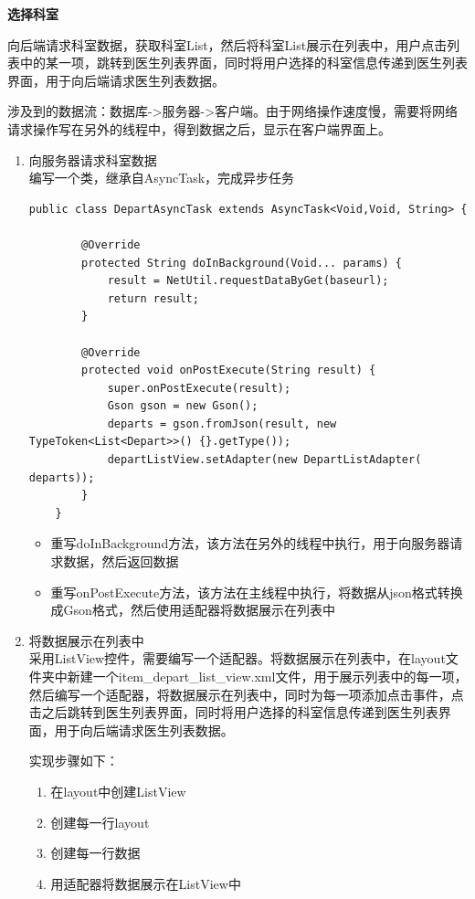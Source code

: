 \documentclass[UTF8,12pt]{article}
\begin{document}
\textbf{选择科室}

向后端请求科室数据，获取科室List，然后将科室List展示在列表中，用户点击列表中的某一项，跳转到医生列表界面，同时将用户选择的科室信息传递到医生列表界面，用于向后端请求医生列表数据。

涉及到的数据流：数据库->服务器->客户端。由于网络操作速度慢，需要将网络请求操作写在另外的线程中，得到数据之后，显示在客户端界面上。

\begin{enumerate}
    \item 向服务器请求科室数据
    \\编写一个类，继承自AsyncTask，完成异步任务
    \begin{lstlisting}[frame=shadowbox]
    public class DepartAsyncTask extends AsyncTask<Void,Void, String> {

        @Override
        protected String doInBackground(Void... params) {
            result = NetUtil.requestDataByGet(baseurl);
            return result;
        }

        @Override
        protected void onPostExecute(String result) {
            super.onPostExecute(result);
            Gson gson = new Gson();
            departs = gson.fromJson(result, new TypeToken<List<Depart>>() {}.getType());
            departListView.setAdapter(new DepartListAdapter( departs));
        }
    }
    \end{lstlisting}

    \begin{itemize}
        \item 重写doInBackground方法，该方法在另外的线程中执行，用于向服务器请求数据，然后返回数据
        \item 重写onPostExecute方法，该方法在主线程中执行，将数据从json格式转换成Gson格式，然后使用适配器将数据展示在列表中
    \end{itemize}

    \item 将数据展示在列表中
    \\采用ListView控件，需要编写一个适配器。将数据展示在列表中，在layout文件夹中新建一个item\_depart\_list\_view.xml文件，用于展示列表中的每一项，然后编写一个适配器，将数据展示在列表中，同时为每一项添加点击事件，点击之后跳转到医生列表界面，同时将用户选择的科室信息传递到医生列表界面，用于向后端请求医生列表数据。

    实现步骤如下：

    \begin{enumerate}
        \item 在layout中创建ListView
        \item 创建每一行layout
        \item 创建每一行数据
        \item 用适配器将数据展示在ListView中
    \end{enumerate}


\end{enumerate}
\end{document}
